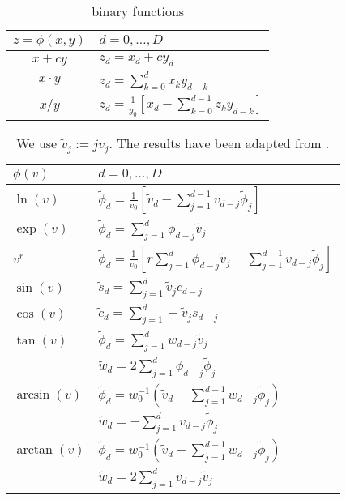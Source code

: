 \documentclass[a4paper,12pt,twoside]{article}
\begin{document}
\begin{table}[!h]
\centering
\begin{tabular}{| c | l |}
\hline
$z= \phi(x,y)$  & $d = 0,\dots,D$\\
\hline
$x + cy$ & $z_d = x_d + c y_d$ \\
$x \cdot y $ & $z_d = \sum_{k=0}^d x_k  y_{d-k}$ \\
$x / y $ & $z_d = \frac{1}{y_0} \left[ x_d - \sum_{k=0}^{d-1} z_k y_{d-k} \right]$\\
\hline
\end{tabular}

\caption{\label{tab:taylor_arithmetic_binary}
binary functions
}
\end{table}
\begin{table}[!h]
\centering
\begin{tabular}{| l | l |}
\hline 
$\phi(v)$  & $d = 0,\dots,D$\\
\hline \hline
$\ln(v)$ & $ \tilde \phi_d = \frac{1}{v_0} \left[ \tilde v_d - \sum_{j=1}^{d-1} v_{d-j} \tilde \phi_j \right]$ \\
\hline
$\exp(v) $ & $ \tilde \phi_d = \sum_{j=1}^d \phi_{d-j} \tilde v_j$ \\
\hline
$ v^r$ & $ \tilde \phi_d = \frac{1}{v_0} \left[ r \sum_{j=1}^d \phi_{d-j} \tilde v_j - \sum_{j=1}^{d-1} v_{d-j} \tilde \phi_j \right]$\\
\hline
$\sin(v)$ & $ \tilde s_d = \sum_{j=1}^d \tilde v_j c_{d-j}$ \\
$\cos(v)$ & $ \tilde c_d = \sum_{j=1}^d - \tilde  v_j s_{d-j} $\\
\hline
$\tan(v)$ & $\tilde  \phi_d = \sum_{j=1}^d w_{d-j} \tilde v_j $ \\
& $\tilde w_d = 2 \sum_{j=1}^d \phi_{d-j} \tilde \phi_j$ \\
\hline
$\arcsin(v)$ & $ \tilde \phi_d = w_0^{-1} \left( \tilde v_d - \sum_{j=1}^{d-1} w_{d-j} \tilde \phi_j \right)$\\
& $ \tilde w_d = - \sum_{j=1}^d v_{d-j} \tilde \phi_j $ \\
\hline
$\arctan(v)$ & $ \tilde \phi_d = w_0^{-1} \left( \tilde v_d - \sum_{j=1}^{d-1} w_{d-j} \tilde \phi_j \right)$\\
& $ \tilde w_d = 2 \sum_{j=1}^d v_{d-j} \tilde v_j $ \\
\hline
\end{tabular}
\caption{\label{tab:taylor_arithmetic_univariate}
We use $\tilde v_j := j v_j$. The results have been adapted from \cite{Griewank2008EDP,Neidinger2005DfC}.
}
\end{table}
 


% 





\end{document}
